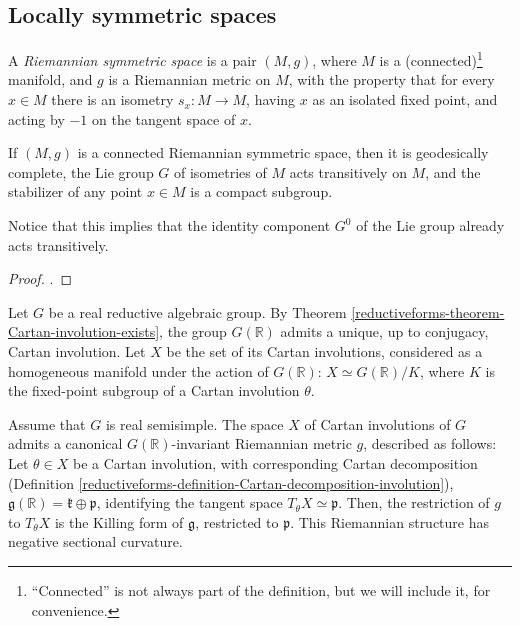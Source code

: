 \subsection{Locally symmetric spaces}
\label{subsection-locally-symmetric}

\begin{definition}
 \label{definition-symmetric}
A {\it Riemannian symmetric space} is a pair $(M,g)$, where $M$ is a (connected)\footnote{``Connected'' is not always part of the definition, but we will include it, for convenience.} manifold, and $g$ is a Riemannian metric on $M$, with the property that for every $x\in M$ there is an isometry $s_x:M\to M$, having $x$ as an isolated fixed point, and acting by $-1$ on the tangent space of $x$. 
\end{definition}


\begin{lemma}
 \label{lemma-symmetric-homogeneous}
If $(M,g)$ is a connected Riemannian symmetric space, then it is geodesically complete, the Lie group $G$ of isometries of $M$ acts transitively on $M$, and the stabilizer of any point $x\in M$ is a compact subgroup.
\end{lemma}

Notice that this implies that the identity component $G^0$ of the Lie group already acts transitively.

\begin{proof}
 \cite[Lemma 1.5 and Proposition 1.11]{Milne-Shimura}.
\end{proof}


Let $G$ be a real reductive algebraic group. By Theorem \ref{reductiveforms-theorem-Cartan-involution-exists}, the group $G(\mathbb R)$ admits a unique, up to conjugacy, Cartan involution.
Let $X$ be the set of its Cartan involutions, considered as a homogeneous manifold under the action of $G(\mathbb R)$: $X\simeq G(\mathbb R)/K$, where $K$ is the fixed-point subgroup of a Cartan involution $\theta$. 

\begin{proposition}
 \label{proposition-Riemannian-metric-GmodK}
Assume that $G$ is real semisimple. The space $X$ of Cartan involutions of $G$ admits a canonical $G(\mathbb R)$-invariant Riemannian metric $g$, described as follows: Let $\theta\in X$ be a Cartan involution, with corresponding Cartan decomposition (Definition \ref{reductiveforms-definition-Cartan-decomposition-involution}), $\mathfrak g(\mathbb R)= \mathfrak k \oplus \mathfrak p$, identifying the tangent space $T_\theta X \simeq \mathfrak p$. Then, the restriction of $g$ to $T_\theta X$ is the Killing form of $\mathfrak g$, restricted to $\mathfrak p$. This Riemannian structure has negative sectional curvature. 
\end{proposition}

